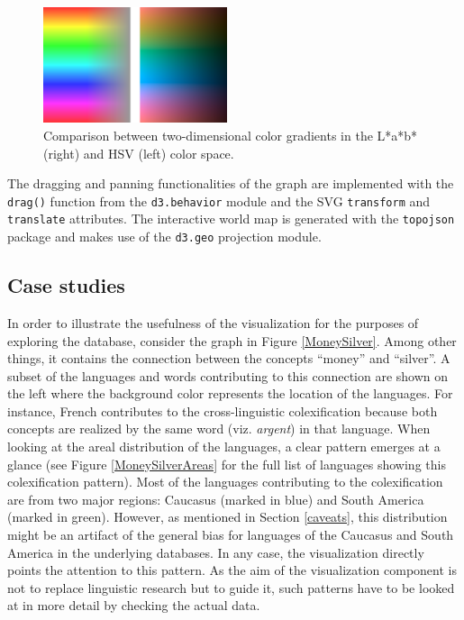 \begin{figure}[h]
    \centering
   \includegraphics[width=0.48\textwidth]{img/Lab_HSV2.png}
    \caption{Comparison between two-dimensional color gradients in the L*a*b* (right) and HSV (left)
    color space.}
    \label{lab vs hsv}
\end{figure}


The  dragging and panning functionalities of the graph are implemented with the \texttt{drag()} function from the \texttt{d3.behavior} module and the SVG \texttt{transform} and \texttt{translate} attributes. The interactive world map is generated with the \texttt{topojson} package and makes use of the \texttt{d3.geo} projection module.

\subsection{Case studies} \label{case study}

In order to illustrate the usefulness of the visualization for the purposes of exploring the database, consider the graph in Figure \ref{MoneySilver}. Among other things, it contains the connection between the concepts ``money'' and ``silver''. A subset of the languages and words contributing to this connection are shown on the left where the background color represents the location of the languages. For instance, French contributes to the cross-linguistic colexification because both concepts are realized by the same word (viz. \textit{argent}) in that language. When looking at the areal distribution of the languages, a clear pattern emerges at a glance (see Figure \ref{MoneySilverAreas} for the full list of languages showing this colexification pattern). Most of the languages contributing to the colexification are from two major regions: Caucasus (marked in blue) and South America (marked in green). However, as mentioned in Section \ref{caveats}, this distribution might be an artifact of the general bias for languages of the Caucasus and South America in the underlying databases. In any case, the visualization directly points the attention to this pattern. As the  aim of the visualization component is not to replace linguistic research but to guide it, such patterns have to be looked at in more detail by checking the actual data. 


